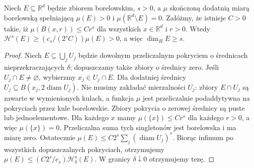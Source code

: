 \begin{twierdzenie}
\label{thm:mass-distribution-26}
Niech $E\subseteq\mathbb R^d$ będzie zbiorem borelowskim,
$s>0$, a $\mu$ skończoną dodatnią miarą borelowską
spełniającą $\mu(E)>0$ i $\mu(\mathbb R^d\setminus E)=0$.
Załóżmy, że istnieje $C>0$ takie, iż
$\mu(B(x,r))\le Cr^s$ dla wszystkich
$x\in\mathbb R^d$ i $r>0$. Wtedy
$\mathcal H^s(E)\ge(c_s/(2^sC))\mu(E)>0$,
a więc $\dim_HE\ge s$.
\end{twierdzenie}
\begin{proof}
Niech $E\subseteq\bigcup_jU_j$ będzie dowolnym
przeliczalnym pokryciem o średnicach nieprzekraczających
$\delta$; dopuszczamy także zbiory o średnicy zero.
Jeśli $U_j\cap E\ne\varnothing$, wybierzmy
$x_j\in U_j\cap E$. Dla dodatniej średnicy
$U_j\subseteq B(x_j,2\operatorname{diam}U_j)$.
Nie musimy zakładać mierzalności $U_j$: zbiory
$E\cap U_j$ są zawarte w wymienionych kulach,
a funkcja $\mu$ jest przeliczalnie podaddytywna
na pokryciach przez kule borelowskie. Zbiory pokrycia
o zerowej średnicy są puste lub jednoelementowe.
Dla każdego $x$ mamy $\mu(\{x\})\le Cr^s$ dla
każdego $r>0$, a więc $\mu(\{x\})=0$.
Przeliczalna suma tych singletonów jest borelowska
i ma miarę zero. Ostatecznie
$\mu(E)\le C2^s\sum_j(\operatorname{diam}U_j)^s$.
Biorąc infimum po wszystkich dopuszczalnych pokryciach,
otrzymujemy $\mu(E)\le(C2^s/c_s)\mathcal H^s_\delta(E)$. W granicy
$\delta\downarrow0$ otrzymujemy tezę.
\end{proof}

